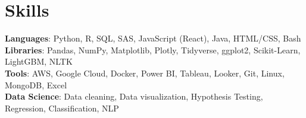 \section{Skills}
 \begin{itemize}[leftmargin=0.15in, label={}]
    \small{\item{
     \textbf{Languages}{: Python, R, SQL, SAS, JavaScript (React), Java, HTML/CSS, Bash} \\
     \textbf{Libraries}{: Pandas, NumPy, Matplotlib, Plotly, Tidyverse, ggplot2, Scikit-Learn, LightGBM, NLTK}\\
     \textbf{Tools}{: AWS, Google Cloud, Docker, Power BI, Tableau, Looker, Git, Linux, MongoDB, Excel}\\
     \textbf{Data Science}{: Data cleaning, Data visualization, Hypothesis Testing, Regression, Classification, NLP}\\
    }}
 \end{itemize}
